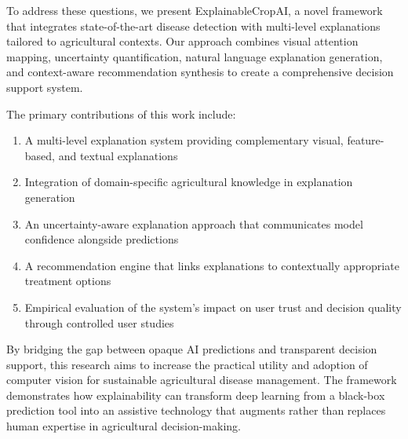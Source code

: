 To address these questions, we present ExplainableCropAI, a novel framework that integrates state-of-the-art disease detection with multi-level explanations tailored to agricultural contexts. Our approach combines visual attention mapping, uncertainty quantification, natural language explanation generation, and context-aware recommendation synthesis to create a comprehensive decision support system.

The primary contributions of this work include:

\begin{enumerate}
    \item A multi-level explanation system providing complementary visual, feature-based, and textual explanations
    \item Integration of domain-specific agricultural knowledge in explanation generation
    \item An uncertainty-aware explanation approach that communicates model confidence alongside predictions
    \item A recommendation engine that links explanations to contextually appropriate treatment options
    \item Empirical evaluation of the system's impact on user trust and decision quality through controlled user studies
\end{enumerate}

By bridging the gap between opaque AI predictions and transparent decision support, this research aims to increase the practical utility and adoption of computer vision for sustainable agricultural disease management. The framework demonstrates how explainability can transform deep learning from a black-box prediction tool into an assistive technology that augments rather than replaces human expertise in agricultural decision-making.
